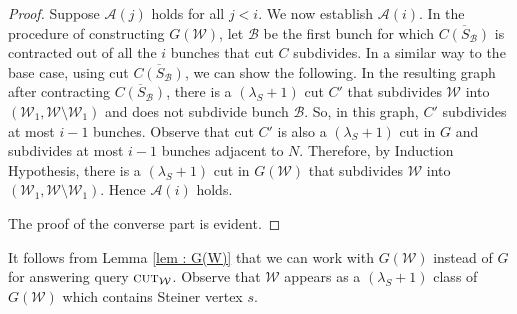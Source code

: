 \documentclass[letterpaper,11pt]{article}
\begin{document}
\begin{proof}
    \noindent
    Suppose ${\mathcal A}(j)$ holds for all $j<i$. We now establish ${\mathcal A}(i)$. In the procedure of constructing $G({\mathcal W})$, let ${\mathcal B}$ be the first bunch for which $\overline{C(S_{\mathcal B})}$ is contracted out of
all the $i$ bunches that cut $C$ subdivides. In a similar way to the base case, using cut $\overline{C(S_{\mathcal B})}$, we can show the following. In the resulting graph after contracting $\overline{C(S_{\mathcal B})}$, there is a $(\lambda_S+1)$ cut $C'$ that subdivides ${\mathcal W}$ into $({\mathcal W}_1,{\mathcal W}\setminus {\mathcal W}_1)$ and does not subdivide bunch ${\mathcal B}$. 
So, in this graph, $C'$ subdivides at most $i-1$ bunches. Observe that cut $C'$ is also a $(\lambda_S+1)$ cut in $G$ and subdivides at most $i-1$ bunches adjacent to $N$. Therefore, by Induction Hypothesis, there is a $(\lambda_S+1)$ cut in $G({\mathcal W})$ that subdivides ${\mathcal W}$ into $({\mathcal W}_1,{\mathcal W}\setminus {\mathcal W}_1)$. Hence ${\mathcal A}(i)$ holds.    
    
    The proof of the converse part is evident. 
\end{proof}
It follows from Lemma \ref{lem : G(W)} that we can work with $G({\mathcal W})$ instead of $G$ for answering query $\textsc{cut}_{\mathcal W}$.
Observe that ${\mathcal W}$ appears as a $(\lambda_S+1)$ class of $G({\mathcal W})$ which contains Steiner vertex $s$.
\end{document}
